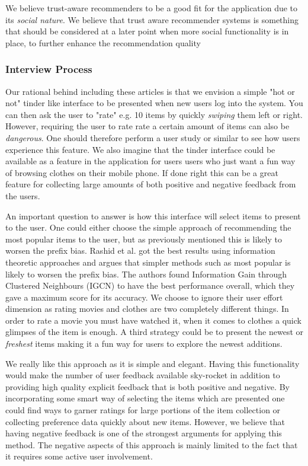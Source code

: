 We believe trust-aware recommenders to be a good fit for the application
due to its \emph{social nature}. We believe that trust aware recommender systems
is something that should be considered at a later point when more social functionality
is in place, to further enhance the recommendation quality
 
\subsubsection{Interview Process}

Our rational behind including these articles is that we envision a simple "hot
or not" tinder like interface to be presented when new users log into the system.
You can then ask the user to "rate" e.g. 10 items by quickly \emph{swiping} them
left or right. However, requiring the user to rate rate a certain amount of items
can also be \emph{dangerous}. One should therefore perform a user study or similar
to see how users experience this feature. We also imagine that the tinder interface
could be available as a feature in the application for users users who just want a 
fun way of browsing clothes on their mobile phone. If done right this can be
a great feature for collecting large amounts of both positive and negative feedback
from the users.

An important question to answer is how this interface will select items to 
present to the user. One could either choose the simple approach of
recommending the most popular items to the user, but as previously mentioned
this is likely to worsen the prefix bias. Rashid et al. \cite{Rashid2008} got
the best results using information theoretic approaches and argues that simpler
methods such as most popular is likely to worsen the prefix bias. The authors
found Information Gain through Clustered Neighbours (IGCN) to have the best
performance overall, which they gave a maximum score for its accuracy. We choose
to ignore their user effort dimension as rating movies and clothes are two
completely different things. In order to rate a movie you must have watched
it, when it comes to clothes a quick glimpses of the item is enough.
A third strategy could be to present the newest or \emph{freshest} items
making it a fun way for users to explore the newest additions.

We really like this approach as it is simple and elegant. Having this
functionality would make the number of user feedback available sky-rocket in addition
to providing high quality explicit feedback that is both positive and negative.
By incorporating some smart way of selecting the items which are presented
one could find ways to garner ratings for large portions of the item collection
or collecting preference data quickly about new items. However, we believe
that having negative feedback is one of the strongest arguments for applying
this method. The negative aspects of this approach is mainly limited to the fact
that it requires some active user involvement.

